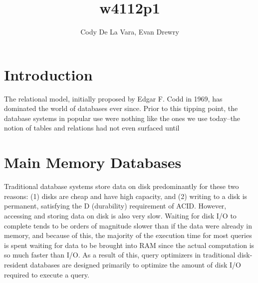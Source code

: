 \documentclass[11pt,a4paper]{report}
\author{Cody De La Vara, Evan Drewry}
\title{w4112p1}
\begin{document}
\maketitle

\chapter*{Introduction}
The relational model, initially proposed by Edgar F. Codd in 1969, has dominated the world of databases ever since.\cite{cod70} Prior to this tipping point, the database systems in popular use were nothing like the ones we use today--the notion of tables and relations had not even surfaced until 
\chapter{Main Memory Databases}
Traditional database systems store data on disk predominantly for these two reasons: (1) disks are cheap and have high capacity, and (2) writing to a disk is permanent, satisfying the D (durability) requirement of ACID. However, accessing and storing data on disk is also very slow. Waiting for disk I/O to complete tends to be orders of magnitude slower than if the data were already in memory, and because of this, the majority of the execution time for most queries is spent waiting for data to be brought into RAM since the actual computation is so much faster than I/O. As a result of this, query optimizers in traditional disk-resident databases are designed primarily to optimize the amount of disk I/O required to execute a query.
\end{document}
